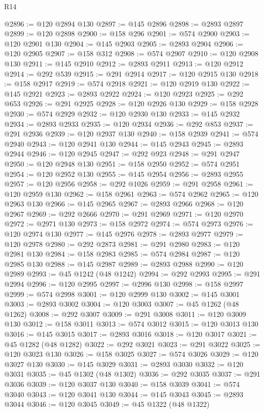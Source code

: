 \begin{lexlean}{R14}
\begin{coremodule}
@2896 := @120 @2894 @130
@2897 := @145 @2896
@2898 := @2893 @2897
@2899 := @120 @2898
@2900 := @158 @296
@2901 := @574 @2900
@2903 := @120 @2901 @130
@2904 := @145 @2903
@2905 := @2893 @2904
@2906 := @120 @2905
@2907 := @158 @312
@2908 := @574 @2907
@2910 := @120 @2908 @130
@2911 := @145 @2910
@2912 := @2893 @2911
@2913 := @120 @2912
@2914 := @292 @539
@2915 := @291 @2914
@2917 := @120 @2915 @130
@2918 := @158 @2917
@2919 := @574 @2918
@2921 := @120 @2919 @130
@2922 := @145 @2921
@2923 := @2893 @2922
@2924 := @120 @2923
@2925 := @292 @653
@2926 := @291 @2925
@2928 := @120 @2926 @130
@2929 := @158 @2928
@2930 := @574 @2929
@2932 := @120 @2930 @130
@2933 := @145 @2932
@2934 := @2893 @2933
@2935 := @120 @2934
@2936 := @292 @853
@2937 := @291 @2936
@2939 := @120 @2937 @130
@2940 := @158 @2939
@2941 := @574 @2940
@2943 := @120 @2941 @130
@2944 := @145 @2943
@2945 := @2893 @2944
@2946 := @120 @2945
@2947 := @292 @923
@2948 := @291 @2947
@2950 := @120 @2948 @130
@2951 := @158 @2950
@2952 := @574 @2951
@2954 := @120 @2952 @130
@2955 := @145 @2954
@2956 := @2893 @2955
@2957 := @120 @2956
@2958 := @292 @1026
@2959 := @291 @2958
@2961 := @120 @2959 @130
@2962 := @158 @2961
@2963 := @574 @2962
@2965 := @120 @2963 @130
@2966 := @145 @2965
@2967 := @2893 @2966
@2968 := @120 @2967
@2969 := @292 @2666
@2970 := @291 @2969
@2971 := @120 @2970
@2972 := @2971 @130
@2973 := @158 @2972
@2974 := @574 @2973
@2976 := @120 @2974 @130
@2977 := @145 @2976
@2978 := @2893 @2977
@2979 := @120 @2978
@2980 := @292 @2873
@2981 := @291 @2980
@2983 := @120 @2981 @130
@2984 := @158 @2983
@2985 := @574 @2984
@2987 := @120 @2985 @130
@2988 := @145 @2987
@2989 := @2893 @2988
@2990 := @120 @2989
@2993 := @45 @1242 (@48 @1242)
@2994 := @292 @2993
@2995 := @291 @2994
@2996 := @120 @2995
@2997 := @2996 @130
@2998 := @158 @2997
@2999 := @574 @2998
@3001 := @120 @2999 @130
@3002 := @145 @3001
@3003 := @2893 @3002
@3004 := @120 @3003
@3007 := @45 @1262 (@48 @1262)
@3008 := @292 @3007
@3009 := @291 @3008
@3011 := @120 @3009 @130
@3012 := @158 @3011
@3013 := @574 @3012
@3015 := @120 @3013 @130
@3016 := @145 @3015
@3017 := @2893 @3016
@3018 := @120 @3017
@3021 := @45 @1282 (@48 @1282)
@3022 := @292 @3021
@3023 := @291 @3022
@3025 := @120 @3023 @130
@3026 := @158 @3025
@3027 := @574 @3026
@3029 := @120 @3027 @130
@3030 := @145 @3029
@3031 := @2893 @3030
@3032 := @120 @3031
@3035 := @45 @1302 (@48 @1302)
@3036 := @292 @3035
@3037 := @291 @3036
@3039 := @120 @3037 @130
@3040 := @158 @3039
@3041 := @574 @3040
@3043 := @120 @3041 @130
@3044 := @145 @3043
@3045 := @2893 @3044
@3046 := @120 @3045
@3049 := @45 @1322 (@48 @1322)

\end{coremodule}
\end{lexlean}
